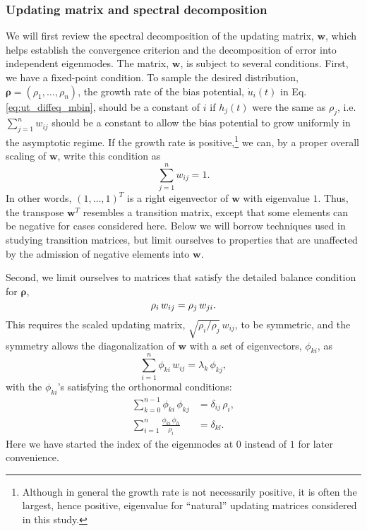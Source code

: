 \documentclass[preprint, superscriptaddress, floatfix]{revtex4-1}
\begin{document}
\subsubsection{\label{sec:updating-matrix}
Updating matrix and spectral decomposition}



We will first review the spectral decomposition
of the updating matrix, $\mathbf w$,
which helps establish the convergence criterion
and the decomposition of error into
independent eigenmodes.
%
The matrix, $\mathbf w$, is subject to several conditions.
%
First, we have a fixed-point condition\cite{bussi2006, dama2014}.
%
To sample the desired distribution,
$\pmb\rho = (\rho_1, \dots, \rho_n)$,
the growth rate of the bias potential,
${\dot u}_i(t)$
in Eq. \eqref{eq:ut_diffeq_mbin},
should be a constant of $i$
if $h_j(t)$ were the same as $\rho_j$,
i.e.
$\sum_{j=1}^n w_{ij}$ should be a constant
to allow the bias potential to grow uniformly
in the asymptotic regime.
%
If the growth rate is positive,\footnote{Although
  in general the growth rate is not necessarily positive,
  it is often the largest, hence positive, eigenvalue
  for ``natural'' updating matrices considered
  in this study.}
we can, by a proper overall scaling of $\mathbf w$,
write this condition as
%
\begin{equation}
  \sum_{j = 1}^n w_{ij} = 1
  .
\label{eq:w_sumj}
\end{equation}
%
In other words, $(1, \dots, 1)^T$
is a right eigenvector of $\mathbf w$
with eigenvalue $1$.
%
Thus, the transpose $\mathbf w^T$
resembles a transition matrix,
except that some elements can be negative
for cases considered here.
%
Below we will %
borrow techniques used
in studying transition matrices\cite{vankampen},
but limit ourselves to properties that are unaffected
by the admission of negative elements into $\mathbf w$.


Second, we limit ourselves to matrices %
that satisfy
the detailed balance condition for $\pmb\rho$,
%
\begin{equation}
  \rho_i \, w_{ij} = \rho_j \, w_{ji}
  .
  \notag
\end{equation}
%
This requires the scaled updating matrix,
$\sqrt{ \rho_i/\rho_j } \, w_{ij}$,
to be symmetric,
and the symmetry allows the diagonalization
of $\mathbf w$ with a set of
eigenvectors, $\phi_{ki}$, as
%
\begin{equation}
  \sum_{i = 1}^n \phi_{ki} \, w_{ij}
  =
  \lambda_k \, \phi_{kj}
  ,
\label{eq:eig_w}
\end{equation}
%
with the $\phi_{ki}$'s satisfying the orthonormal conditions\cite{vankampen}:
%
\begin{align}
  \sum_{k = 0}^{n - 1}
    \phi_{ki} \, \phi_{kj}
  &=
  \delta_{ij} \, \rho_i,
  \label{eq:eig_orthonormal_cols}
  \\
  \sum_{i = 1}^n
    \frac{ \phi_{ki} \, \phi_{li} }
         { \rho_i }
  &=
  \delta_{kl}
  .
  \label{eq:eig_orthonormal_rows}
\end{align}
%
Here we have started the index of the eigenmodes at $0$
instead of $1$ for later convenience.
\end{document}
